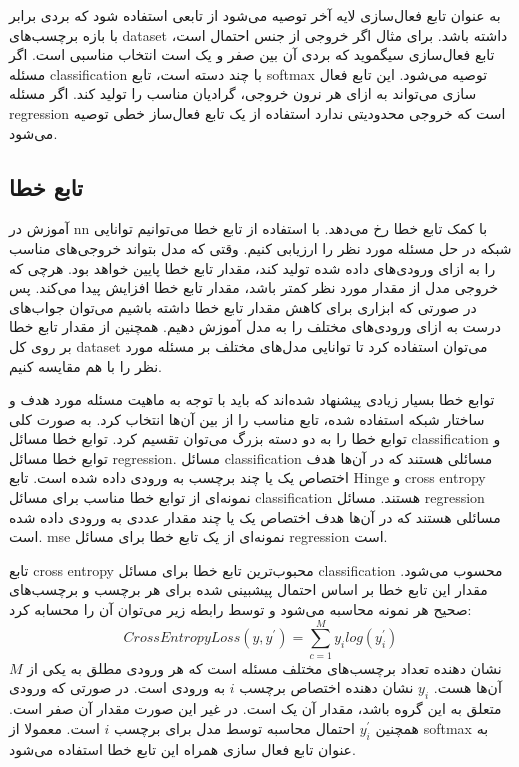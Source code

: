 به عنوان تابع فعال‌سازی لایه آخر توصیه می‌شود از تابعی استفاده شود که بردی برابر
با بازه برچسب‌های \gls{dataset} داشته باشد. برای مثال اگر خروجی از جنس احتمال
است، تابع فعال‌سازی سیگموید که بردی آن بین صفر و یک است انتخاب مناسبی است. اگر
مسئله \gls{classification} با چند دسته است، تابع softmax توصیه می‌شود. این تابع
فعال سازی می‌تواند به ازای هر نرون خروجی، گرادیان مناسب را تولید کند. اگر مسئله
\gls{regression} است که خروجی محدودیتی ندارد استفاده از یک تابع فعال‌ساز خطی
توصیه می‌شود.

\subsection{تابع خطا}
آموزش در \gls{nn} با کمک تابع خطا رخ می‌دهد. با استفاده از تابع خطا می‌توانیم
توانایی شبکه در حل مسئله مورد نظر را ارزیابی کنیم. وقتی که مدل بتواند خروجی‌های
مناسب را به ازای ورودی‌های داده شده تولید کند، مقدار تابع خطا پایین خواهد بود.
هرچی که خروجی مدل از مقدار مورد نظر کمتر باشد، مقدار تابع خطا افزایش پیدا
می‌کند. پس در صورتی که ابزاری برای کاهش مقدار تابع خطا داشته باشیم می‌توان
جواب‌های درست به ازای ورودی‌های مختلف را به مدل آموزش دهیم. همچنین از مقدار تابع
خطا بر روی کل \gls{dataset} می‌توان استفاده کرد تا توانایی مدل‌های مختلف بر
مسئله مورد نظر را با هم مقایسه کنیم.

توابع خطا بسیار زیادی پیشنهاد شده‌اند که باید با توجه به ماهیت مسئله مورد هدف و
ساختار شبکه استفاده شده، تابع مناسب را از بین آن‌ها انتخاب کرد. به صورت کلی
توابع خطا را به دو دسته بزرگ می‌توان تقسیم کرد. توابع خطا مسائل
\gls{classification} و توابع خطا مسائل \gls{regression}. مسائل
\gls{classification} مسائلی هستند که در آن‌ها هدف اختصاص یک یا چند برچسب به
ورودی داده شده است. تابع Hinge و \gls{cross entropy} نمونه‌ای از توابع خطا مناسب
برای مسائل \gls{classification} هستند. مسائل \gls{regression} مسائلی هستند که در
آن‌ها هدف اختصاص یک یا چند مقدار عددی به ورودی داده شده است. \gls{mse} نمونه‌ای
از یک تابع خطا برای مسائل \gls{regression} است.

تابع \gls{cross entropy} محبوب‌ترین تابع خطا برای مسائل \gls{classification}
محسوب می‌شود. مقدار این تابع خطا بر اساس احتمال پیشبینی شده برای هر برچسب و
برچسب‌های صحیح هر نمونه محاسبه می‌شود و توسط رابطه زیر می‌توان آن را محسابه کرد:
\begin{equation}
    CrossEntropyLoss(y, y^\prime) = \sum_{c=1}^{M} y_i log(y_i^\prime)
\end{equation}
$M$ نشان دهنده تعداد برچسب‌های مختلف مسئله است که هر ورودی مطلق به یکی از آن‌ها
هست. $y_i$ نشان دهنده اختصاص برچسب $i$ به ورودی است. در صورتی که ورودی متعلق به
این گروه باشد، مقدار آن یک است. در غیر این صورت مقدار آن صفر است. همچنین
$y_i^\prime$ احتمال محاسبه توسط مدل برای برچسب $i$ است. معمولا از softmax به
عنوان تابع فعال سازی همراه این تابع خطا استفاده می‌شود.

